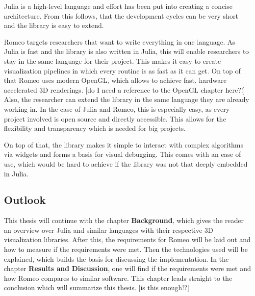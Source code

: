 Julia is a high-level language and effort has been put into creating a concise architecture. From this follows, that the development cycles can be very short and the library is easy to extend.

Romeo targets researchers that want to write everything in one language.
As Julia is fast and the library is also written in Julia, this will enable researchers to stay in the same language for their project. 
This makes it easy to create visualization pipelines in which every routine is as fast as it can get. 
On top of that Romeo uses modern OpenGL, which allows to achieve fast, hardware accelerated 3D renderings. [do I need a reference to the OpenGL chapter here?!]
Also, the researcher can extend the library in the same language they are already working in. 
In the case of Julia and Romeo, this is especially easy, as every project involved is open source and directly accessible.
This allows for the flexibility and transparency which is needed for big projects.

On top of that, the library makes it simple to interact with complex algorithms via widgets and forms a basis for visual debugging. 
This comes with an ease of use, which would be hard to achieve if the library was not that deeply embedded in Julia.


\subsection{Outlook}
This thesis will continue with the chapter \textbf{Background}, which gives the reader an overview over Julia and similar languages with their respective 3D visualization libraries.
After this, the requirements for Romeo will be laid out and how to measure if the requirements were met.
Then the technologies used will be explained, which builds the basis for discussing the implementation.
In the chapter \textbf{Results and Discussion}, one will find if the requirements were met and how Romeo compares to similar software.
This chapter leads straight to the conclusion which will summarize this thesis.
[is this enough!?]